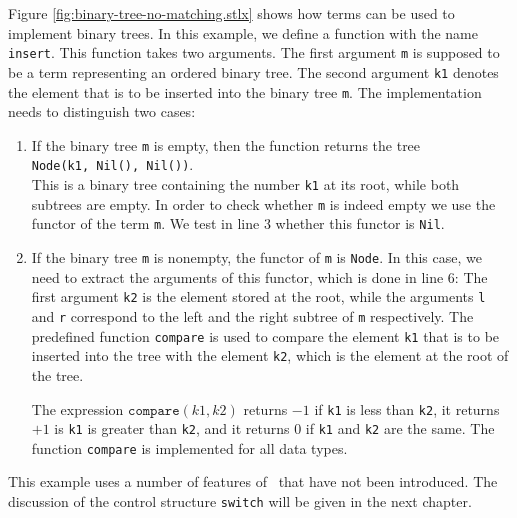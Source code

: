 Figure \ref{fig:binary-tree-no-matching.stlx} shows how terms can be used to implement
binary trees.  In this example, we define a function with the name \texttt{insert}.  This function
takes two arguments.  The first argument \texttt{m} is supposed to be a term representing an ordered binary
tree.  The second argument \texttt{k1} denotes the element that is to be inserted into the binary
tree \texttt{m}.   The implementation needs to distinguish two cases:
\begin{enumerate}
\item If the binary tree \texttt{m} is empty, then the function returns the tree
      \\[0.2cm]
      \hspace*{1.3cm}
      \texttt{Node(k1, Nil(), Nil())}.
      \\[0.2cm]
      This is a binary tree containing the number \texttt{k1} at its root, while both subtrees are
      empty.  In order to check whether \texttt{m} is indeed empty we use the functor of the term \texttt{m}.  We test in line
      3 whether this functor is \texttt{Nil}.
\item If the binary tree \texttt{m} is nonempty, the functor of \texttt{m} is
      \texttt{Node}.  In this case, we need to extract the arguments of this
      functor, which is done in line 6: The first argument \texttt{k2} is the element stored at the
      root, while the arguments \texttt{l} and \texttt{r} correspond to the left and the right
      subtree of \texttt{m} respectively.  The predefined function \texttt{compare} is used to
      compare the element \texttt{k1} that is to be inserted into the tree with the element
      \texttt{k2}, which is the element at the root of the tree.

      The expression $\texttt{compare}(k1, k2)$ returns $-1$ if \texttt{k1} is less than
      \texttt{k2}, it returns $+1$ is \texttt{k1} is greater than \texttt{k2}, and it returns $0$
      if \texttt{k1} and \texttt{k2} are the same.  The function \texttt{compare} is implemented for
      all data types. 
\end{enumerate}
This example uses a number of features of \setlx\ that have not been introduced. The discussion of
the control structure \texttt{switch} will be given in the next chapter.

